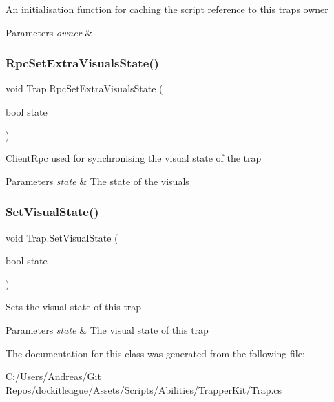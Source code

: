An initialisation function for caching the script reference to this trap\textquotesingle{}s owner 


\begin{DoxyParams}{Parameters}
{\em owner} & \\
\hline
\end{DoxyParams}
\hypertarget{class_trap_acd3eda72aa05132de5ae7907f277261f}{}\label{class_trap_acd3eda72aa05132de5ae7907f277261f} 
\subsubsection{\texorpdfstring{Rpc\+Set\+Extra\+Visuals\+State()}{RpcSetExtraVisualsState()}}
{\footnotesize\ttfamily void Trap.\+Rpc\+Set\+Extra\+Visuals\+State (\begin{DoxyParamCaption}\item[{bool}]{state }\end{DoxyParamCaption})\hspace{0.3cm}{\ttfamily [protected]}}



Client\+Rpc used for synchronising the visual state of the trap 


\begin{DoxyParams}{Parameters}
{\em state} & The state of the visuals\\
\hline
\end{DoxyParams}
\hypertarget{class_trap_a432fa6ae980bb74cac0c7b95eb9b1d7e}{}\label{class_trap_a432fa6ae980bb74cac0c7b95eb9b1d7e} 
\subsubsection{\texorpdfstring{Set\+Visual\+State()}{SetVisualState()}}
{\footnotesize\ttfamily void Trap.\+Set\+Visual\+State (\begin{DoxyParamCaption}\item[{bool}]{state }\end{DoxyParamCaption})}



Sets the visual state of this trap 


\begin{DoxyParams}{Parameters}
{\em state} & The visual state of this trap\\
\hline
\end{DoxyParams}


The documentation for this class was generated from the following file\+:\begin{DoxyCompactItemize}
\item 
C\+:/\+Users/\+Andreas/\+Git Repos/dockitleague/\+Assets/\+Scripts/\+Abilities/\+Trapper\+Kit/Trap.\+cs\end{DoxyCompactItemize}
